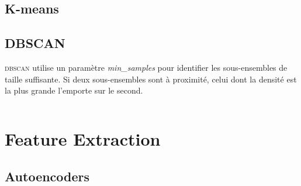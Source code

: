 \documentclass[../../cs-notes.tex]{subfiles}
\begin{document}
	\section{K-means}


	\section{DBSCAN}
	\textsc{dbscan} utilise un paramètre \textit{min\_samples} pour identifier les sous-ensembles de taille suffisante.
	Si deux sous-ensembles sont à proximité, celui dont la densité est la plus grande l'emporte sur le second.

	\inputminted{python}{code/machine-learning/unsupervised-learning/dbscan.py}

	\chapter{Feature Extraction}

	\section{Autoencoders}

	
\end{document}
